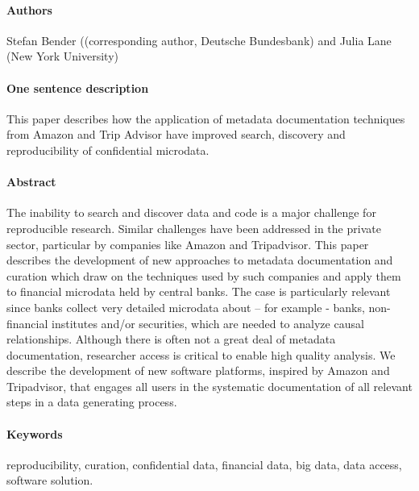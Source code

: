 \paragraph{Authors}  Stefan Bender  ((corresponding author, Deutsche Bundesbank) and Julia Lane  (New York University)
\paragraph{One sentence description}  This paper describes how the application of metadata documentation techniques from Amazon and Trip Advisor have improved search, discovery and reproducibility of confidential microdata.

\paragraph{Abstract}
The inability to search and discover data and code is a major challenge for reproducible research.  Similar challenges have been addressed in the private sector, particular by companies like Amazon and Tripadvisor.  This paper describes the development of new approaches to metadata documentation and curation which draw on the techniques used by such companies and apply them to financial microdata held by central banks.  
The case is particularly relevant since banks collect very detailed microdata about – for example - banks, non-financial institutes and/or securities, which are needed to analyze causal relationships.  Although there is often not a great deal of metadata documentation, researcher access is critical to enable high quality analysis. We describe the development of new software platforms, inspired by Amazon and Tripadvisor, that engages all users in the systematic documentation of all relevant steps in a data generating process. 

\paragraph{Keywords} reproducibility, curation, confidential data, financial data, big data, data access, software solution.
